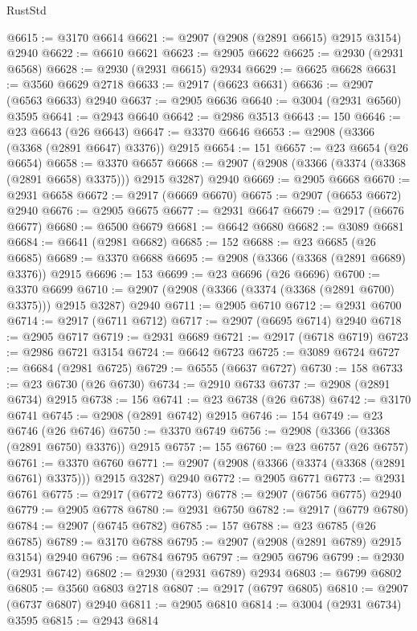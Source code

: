 \begin{lexlean}{RustStd}
\begin{coremodule}
@6615 := @3170 @6614
@6621 := @2907 (@2908 (@2891 @6615) @2915 @3154) @2940
@6622 := @6610 @6621
@6623 := @2905 @6622
@6625 := @2930 (@2931 @6568)
@6628 := @2930 (@2931 @6615) @2934
@6629 := @6625 @6628
@6631 := @3560 @6629 @2718
@6633 := @2917 (@6623 @6631)
@6636 := @2907 (@6563 @6633) @2940
@6637 := @2905 @6636
@6640 := @3004 (@2931 @6560) @3595
@6641 := @2943 @6640
@6642 := @2986 @3513
@6643 := 150
@6646 := @23 @6643 (@26 @6643)
@6647 := @3370 @6646
@6653 := @2908 (@3366 (@3368 (@2891 @6647) @3376)) @2915
@6654 := 151
@6657 := @23 @6654 (@26 @6654)
@6658 := @3370 @6657
@6668 := @2907 (@2908 (@3366 (@3374 (@3368 (@2891 @6658) @3375))) @2915 @3287) @2940
@6669 := @2905 @6668
@6670 := @2931 @6658
@6672 := @2917 (@6669 @6670)
@6675 := @2907 (@6653 @6672) @2940
@6676 := @2905 @6675
@6677 := @2931 @6647
@6679 := @2917 (@6676 @6677)
@6680 := @6500 @6679
@6681 := @6642 @6680
@6682 := @3089 @6681
@6684 := @6641 (@2981 @6682)
@6685 := 152
@6688 := @23 @6685 (@26 @6685)
@6689 := @3370 @6688
@6695 := @2908 (@3366 (@3368 (@2891 @6689) @3376)) @2915
@6696 := 153
@6699 := @23 @6696 (@26 @6696)
@6700 := @3370 @6699
@6710 := @2907 (@2908 (@3366 (@3374 (@3368 (@2891 @6700) @3375))) @2915 @3287) @2940
@6711 := @2905 @6710
@6712 := @2931 @6700
@6714 := @2917 (@6711 @6712)
@6717 := @2907 (@6695 @6714) @2940
@6718 := @2905 @6717
@6719 := @2931 @6689
@6721 := @2917 (@6718 @6719)
@6723 := @2986 @6721 @3154
@6724 := @6642 @6723
@6725 := @3089 @6724
@6727 := @6684 (@2981 @6725)
@6729 := @6555 (@6637 @6727)
@6730 := 158
@6733 := @23 @6730 (@26 @6730)
@6734 := @2910 @6733
@6737 := @2908 (@2891 @6734) @2915
@6738 := 156
@6741 := @23 @6738 (@26 @6738)
@6742 := @3170 @6741
@6745 := @2908 (@2891 @6742) @2915
@6746 := 154
@6749 := @23 @6746 (@26 @6746)
@6750 := @3370 @6749
@6756 := @2908 (@3366 (@3368 (@2891 @6750) @3376)) @2915
@6757 := 155
@6760 := @23 @6757 (@26 @6757)
@6761 := @3370 @6760
@6771 := @2907 (@2908 (@3366 (@3374 (@3368 (@2891 @6761) @3375))) @2915 @3287) @2940
@6772 := @2905 @6771
@6773 := @2931 @6761
@6775 := @2917 (@6772 @6773)
@6778 := @2907 (@6756 @6775) @2940
@6779 := @2905 @6778
@6780 := @2931 @6750
@6782 := @2917 (@6779 @6780)
@6784 := @2907 (@6745 @6782)
@6785 := 157
@6788 := @23 @6785 (@26 @6785)
@6789 := @3170 @6788
@6795 := @2907 (@2908 (@2891 @6789) @2915 @3154) @2940
@6796 := @6784 @6795
@6797 := @2905 @6796
@6799 := @2930 (@2931 @6742)
@6802 := @2930 (@2931 @6789) @2934
@6803 := @6799 @6802
@6805 := @3560 @6803 @2718
@6807 := @2917 (@6797 @6805)
@6810 := @2907 (@6737 @6807) @2940
@6811 := @2905 @6810
@6814 := @3004 (@2931 @6734) @3595
@6815 := @2943 @6814

\end{coremodule}
\end{lexlean}
